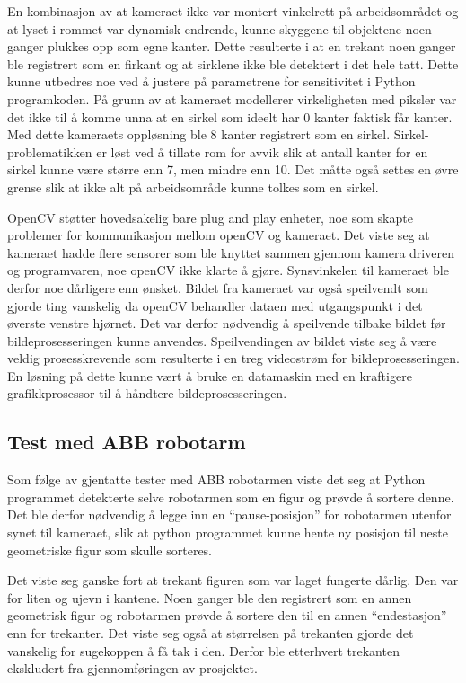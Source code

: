 \documentclass[conference]{IEEEtran}
\begin{document}
        En kombinasjon av at kameraet ikke var montert vinkelrett på arbeidsområdet og at lyset i rommet var dynamisk endrende, kunne skyggene til 
        objektene noen ganger plukkes opp som egne kanter. Dette resulterte i at en trekant noen ganger ble registrert som en firkant og at sirklene 
        ikke ble detektert i det hele tatt. Dette kunne utbedres noe ved å justere på parametrene for sensitivitet i Python programkoden. På grunn av 
        at kameraet modellerer virkeligheten med piksler var det ikke til å komme unna at en sirkel som ideelt har 0 kanter faktisk får kanter. Med dette kameraets
        oppløsning ble 8 kanter registrert som en sirkel. Sirkel-problematikken er løst ved å tillate rom for avvik slik at antall 
        kanter for en sirkel kunne være større enn 7, men mindre enn 10. Det måtte også settes en øvre grense slik at ikke alt på arbeidsområde kunne tolkes 
        som en sirkel. 

        OpenCV støtter hovedsakelig bare plug and play enheter, noe som skapte problemer for kommunikasjon mellom openCV og kameraet. Det viste seg at 
        kameraet hadde flere sensorer som ble knyttet sammen gjennom kamera driveren og programvaren, noe openCV ikke klarte å gjøre. Synsvinkelen til 
        kameraet ble derfor noe dårligere enn ønsket. Bildet fra kameraet var også speilvendt som gjorde ting vanskelig da openCV behandler dataen med 
        utgangspunkt i det øverste venstre hjørnet. Det var derfor nødvendig å speilvende tilbake bildet før bildeprosesseringen kunne anvendes. 
        Speilvendingen av bildet viste seg å være veldig prosesskrevende som resulterte i en treg videostrøm for bildeprosesseringen. En løsning på dette 
        kunne vært å bruke en datamaskin med en kraftigere grafikkprosessor til å håndtere bildeprosesseringen. 

    \subsection{Test med ABB robotarm}
        Som følge av gjentatte tester med ABB robotarmen viste det seg at Python programmet detekterte selve robotarmen som en figur og prøvde å sortere 
        denne. Det ble derfor nødvendig å legge inn en “pause-posisjon” for robotarmen utenfor synet til kameraet, slik at python programmet kunne hente 
        ny posisjon til neste geometriske figur som skulle sorteres.

        Det viste seg ganske fort at trekant figuren som var laget fungerte dårlig. Den var for liten og ujevn i kantene. Noen ganger ble den registrert 
        som en annen geometrisk figur og robotarmen prøvde å sortere den til en annen “endestasjon” enn for trekanter. Det viste seg også at størrelsen 
        på trekanten gjorde det vanskelig for sugekoppen å få tak i den. Derfor ble etterhvert trekanten ekskludert fra gjennomføringen av prosjektet. 
\end{document}
